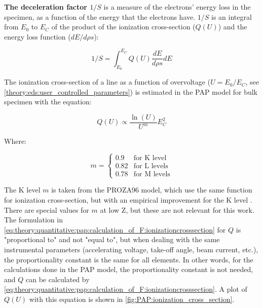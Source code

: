 \textbf{The deceleration factor $1/S$} is a measure of the electrons' energy loss in the specimen, as a function of the energy that the electrons have.
$1/S$ is an integral from $E_0$ to $E_C$ of the product of the ionization cross-section ($Q(U)$) and the energy loss function ($dE/d\rho s$):

\begin{equation}
    \label{eq:theory:quantitative:pap:calculation_of_F:S}
    1/S = \int_{E_0}^{E_C} Q(U)\frac{dE}{d\rho s} dE
\end{equation}

The ionization cross-section of a line as a function of overvoltage ($U = E_0/E_C$, see \cref{theory:eds:user_controlled_parameters}) is estimated in the PAP model for bulk specimen with the equation:

\begin{equation}
    \label{eq:theory:quantitative:pap:calculation_of_F:ionizationcrosssection}
    Q(U) \propto \frac{\ln(U)}{U^m} E_C^2
\end{equation}

Where:

\begin{equation}
    \label{eq:theory:quantitative:pap:calculation_of_F:ionizationcrosssection:m}
    m = \begin{cases}
        0.9  & \text{for K level}  \\
        0.82 & \text{for L levels} \\
        0.78 & \text{for M levels}
    \end{cases}
\end{equation}

The K level $m$ is taken from the PROZA96 model, which use the same function for ionization cross-section, but with an empirical improvement for the K level \cite{bastin_proza96_1998}.
There are special values for $m$ at low Z, but these are not relevant for this work.
The formulation in \cref{eq:theory:quantitative:pap:calculation_of_F:ionizationcrosssection} for $Q$ is "proportional to" and not "equal to", but when dealing with the same instrumental parameters (accelerating voltage, take-off angle, beam current, etc.), the proportionality constant is the same for all elements.
In other words, for the calculations done in the PAP model, the proportionality constant is not needed, and $Q$ can be calculated by \cref{eq:theory:quantitative:pap:calculation_of_F:ionizationcrosssection}.
A plot of $Q(U)$ with this equation is shown in \cref{fig:PAP:ionization_cross_section}.


